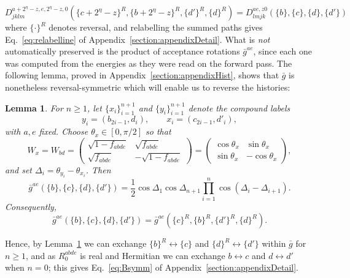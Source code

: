 \documentclass[aps,floatfix,10pt,amssymb,amsfont,amsmath,superscriptaddress,float,nofootinbib,longbibliography,nobalancelastpage,twocolumn]{revtex4-2}
\newtheorem{lemma}{Lemma}
\begin{document}
\begin{widetext}
\begin{equation}
   D^{a+2^{\eta}-z,e,2^\eta-z,0}_{jklm}(\{c+2^{\eta}-z\}^R,\{b+2^{\eta}-z\}^R,\{d'\}^R,\{d\}^R) =  D^{ae,z0}_{lmjk}(\{b\},\{c\},\{d\},\{d'\})
   \label{eq:Dreversal}
\end{equation}
where $\{\cdot\}^R$ denotes reversal, and relabelling the summed paths gives Eq.~\eqref{eq:relabelline} of Appendix~\ref{section:appendixDetail}. What is \emph{not} automatically preserved is the product of acceptance rotations $\bar g^{ae}$, since each one was computed from the energies as they were read on the forward pass. The following lemma, proved in Appendix~\ref{section:appendixHist}, shows that $\bar g$ is nonetheless reversal-symmetric which will enable us to reverse the histories:
\begin{lemma}
\label{lemma:summed-history-reversal}
For $n\geq1$, let $\{x_i\}_{i=1}^{n+1}$ and $\{y_i\}_{i=1}^{n+1}$ denote
the compound labels
\begin{equation*}
    y_i=(b_{2i-1},d_i),\qquad x_i=(c_{2i-1},d'_i),
\end{equation*}
with $a,e$ fixed.  Choose $\theta_x\in[0,\pi/2]$ so that
\begin{equation*}
    W_x=W_{bd}=\begin{pmatrix}
                \sqrt{1 - f_{abde}} & \sqrt{f_{abde}}\\
       \sqrt{f_{abde}} & -\sqrt{1 - f_{abde}}
    \end{pmatrix}= \begin{pmatrix}\cos\theta_x&\sin\theta_x\\
    \sin\theta_x&-\cos\theta_x\end{pmatrix},
\end{equation*}
and set $\Delta_i=\theta_{y_i}-\theta_{x_i}$.  Then
\begin{equation}
    \bar g^{ae}(\{b\},\{c\},\{d\},\{d'\})
    =\frac12\cos\Delta_1\cos\Delta_{n+1}
      \prod_{i=1}^{n}\cos(\Delta_i-\Delta_{i+1}).
\end{equation}
Consequently,
\begin{equation}
    \bar g^{ae}(\{b\},\{c\},\{d\},\{d'\})
    =\bar g^{ae}(\{c\}^R,\{b\}^R,\{d'\}^R,\{d\}^R).
    \label{eq:PRR}
\end{equation}
\end{lemma}
Hence, by Lemma~\ref{lemma:summed-history-reversal} we can exchange $\{b\}^R \leftrightarrow \{c\}$ and $\{d\}^R \leftrightarrow \{d'\}$ within $\bar g$ for $n\geq 1$, and as $R_0^{abde}$ is real and Hermitian we can exchange $b \leftrightarrow c$ and $d \leftrightarrow d'$ when $n=0$; this gives Eq.~\eqref{eq:Bsymm} of Appendix~\ref{section:appendixDetail}.


\end{widetext}
\end{document}

